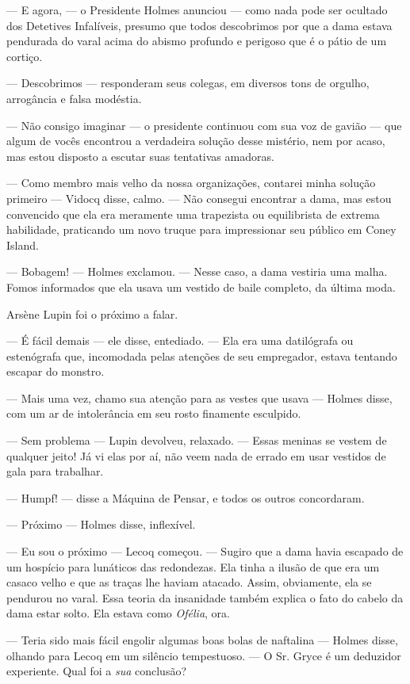 --- E agora, --- o Presidente Holmes anunciou --- como nada pode ser
ocultado dos Detetives Infalíveis, presumo que todos descobrimos por que
a dama estava pendurada do varal acima do abismo profundo e perigoso que
é o pátio de um cortiço.

--- Descobrimos --- responderam seus colegas, em diversos tons de
orgulho, arrogância e falsa modéstia.

--- Não consigo imaginar --- o presidente continuou com sua voz de
gavião --- que algum de vocês encontrou a verdadeira solução desse
mistério, nem por acaso, mas estou disposto a escutar suas tentativas
amadoras.

--- Como membro mais velho da nossa organizações, contarei minha solução
primeiro --- Vidocq disse, calmo. --- Não consegui encontrar a dama, mas
estou convencido que ela era meramente uma trapezista ou equilibrista de
extrema habilidade, praticando um novo truque para impressionar seu
público em Coney Island.

--- Bobagem! --- Holmes exclamou. --- Nesse caso, a dama vestiria uma
malha. Fomos informados que ela usava um vestido de baile completo, da
última moda.

Arsène Lupin foi o próximo a falar.

--- É fácil demais --- ele disse, entediado. --- Ela era uma datilógrafa
ou estenógrafa que, incomodada pelas atenções de seu empregador, estava
tentando escapar do monstro.

--- Mais uma vez, chamo sua atenção para as vestes que usava --- Holmes
disse, com um ar de intolerância em seu rosto finamente esculpido.

--- Sem problema --- Lupin devolveu, relaxado. --- Essas meninas se
vestem de qualquer jeito! Já vi elas por aí, não veem nada de errado em
usar vestidos de gala para trabalhar.

--- Humpf! --- disse a Máquina de Pensar, e todos os outros concordaram.

--- Próximo --- Holmes disse, inflexível.

--- Eu sou o próximo --- Lecoq começou. --- Sugiro que a dama havia
escapado de um hospício para lunáticos das redondezas. Ela tinha a
ilusão de que era um casaco velho e que as traças lhe haviam atacado.
Assim, obviamente, ela se pendurou no varal. Essa teoria da insanidade
também explica o fato do cabelo da dama estar solto. Ela estava como
\emph{Ofélia}, ora.

--- Teria sido mais fácil engolir algumas boas bolas de naftalina ---
Holmes disse, olhando para Lecoq em um silêncio tempestuoso. --- O Sr.
Gryce é um deduzidor experiente. Qual foi a \emph{sua} conclusão?

